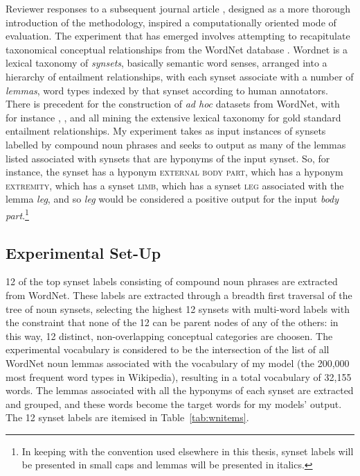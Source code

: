 Reviewer responses to a subsequent journal article \citep{McGregorEA2015c}, designed as a more thorough introduction of the methodology, inspired a computationally oriented mode of evaluation.  The experiment that has emerged involves attempting to recapitulate taxonomical conceptual relationships from the WordNet database \citep{Fellbaum1998}.  Wordnet is a lexical taxonomy of \emph{synsets}, basically semantic word senses, arranged into a hierarchy of entailment relationships, with each synset associate with a number of \emph{lemmas}, word types indexed by that synset according to human annotators.  There is precedent for the construction of \emph{ad hoc} datasets from WordNet, with for instance \cite{BaroniEA2012}, \cite{RiedlEA2013}, and \cite{MelamudEA2014} all mining the extensive lexical taxonomy for gold standard entailment relationships.  My experiment takes as input instances of synsets labelled by compound noun phrases and seeks to output as many of the lemmas listed associated with synsets that are hyponyms of the input synset.  So, for instance, the synset  has a hyponym \textsc{external body part}, which has a hyponym \textsc{extremity}, which has a synset \textsc{limb}, which has a synset \textsc{leg} associated with the lemma \emph{leg}, and so \emph{leg} would be considered a positive output for the input \emph{body part}.\footnote{In keeping with the convention used elsewhere in this thesis, synset labels will be presented in small caps and lemmas will be presented in italics.}

\subsection{Experimental Set-Up}
12 of the top synset labels consisting of compound noun phrases are extracted from WordNet.  These labels are extracted through a breadth first traversal of the tree of noun synsets, selecting the highest 12 synsets with multi-word labels with the constraint that none of the 12 can be parent nodes of any of the others: in this way, 12 distinct, non-overlapping conceptual categories are choosen.  The experimental vocabulary is considered to be the intersection of the list of all WordNet noun lemmas associated with the vocabulary of my model (the 200,000 most frequent word types in Wikipedia), resulting in a total vocabulary of 32,155 words.  The lemmas associated with all the hyponyms of each synset are extracted and grouped, and these words become the target words for my models' output.  The 12 synset labels are itemised in Table~\ref{tab:wnitems}.

